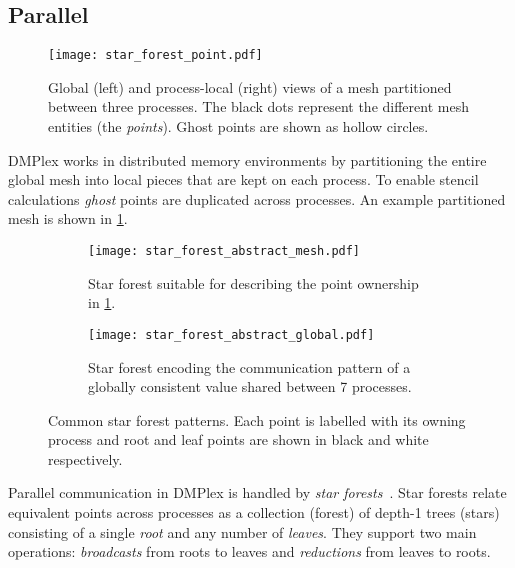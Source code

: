 \documentclass[thesis]{subfiles}
\begin{document}
\subsection{Parallel}
\label{sec:dmplex_parallel}

\begin{figure}
  \centering
  \texttt{[image: star\_forest\_point.pdf]}
  \caption{
    Global (left) and process-local (right) views of a mesh partitioned between three processes.
    The black dots represent the different mesh entities (the \emph{points}).
    Ghost points are shown as hollow circles.
  }
  \label{fig:dmplex_split_mesh}
\end{figure}

DMPlex works in distributed memory environments by partitioning the entire global mesh into local pieces that are kept on each process.
To enable stencil calculations \emph{ghost} points are duplicated across processes.
An example partitioned mesh is shown in \cref{fig:dmplex_split_mesh}.

\begin{figure}
  \centering
  \begin{subfigure}[t]{.45\textwidth}
    \centering
    \texttt{[image: star\_forest\_abstract\_mesh.pdf]}
    \caption{Star forest suitable for describing the point ownership in \cref{fig:dmplex_split_mesh}.}
    \label{fig:star_forest_abstract_mesh}
  \end{subfigure}
  \hspace{1em}
  \begin{subfigure}[t]{.45\textwidth}
    \centering
    \texttt{[image: star\_forest\_abstract\_global.pdf]}
    \caption{Star forest encoding the communication pattern of a globally consistent value shared between 7 processes.}
    \label{fig:star_forest_abstract_global}
  \end{subfigure}
  \caption{
    Common star forest patterns.
    Each point is labelled with its owning process and root and leaf points are shown in black and white respectively.
  }
\end{figure}

Parallel communication in DMPlex is handled by \emph{star forests}~\cite{zhangPetscSFScalableCommunication2021}.
Star forests relate equivalent points across processes as a collection (forest) of depth-1 trees (stars) consisting of a single \emph{root} and any number of \emph{leaves}.
They support two main operations: \emph{broadcasts} from roots to leaves and \emph{reductions} from leaves to roots.
\end{document}
